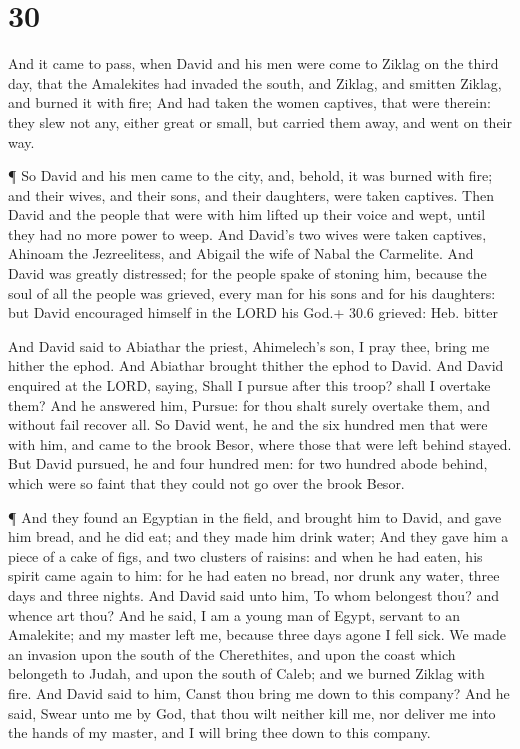 \hypertarget{section-29}{%
\section{30}\label{section-29}}

 And it came to pass, when David and his men were come to
Ziklag on the third day, that the Amalekites had invaded the south, and
Ziklag, and smitten Ziklag, and burned it with fire;  And
had taken the women captives, that were therein: they slew not any,
either great or small, but carried them away, and went on their way.

 ¶ So David and his men came to the city, and, behold, it
was burned with fire; and their wives, and their sons, and their
daughters, were taken captives.  Then David and the people
that were with him lifted up their voice and wept, until they had no
more power to weep.  And David's two wives were taken
captives, Ahinoam the Jezreelitess, and Abigail the wife of Nabal the
Carmelite.  And David was greatly distressed; for the people
spake of stoning him, because the soul of all the people was grieved,
every man for his sons and for his daughters: but David encouraged
himself in the LORD his God.+ 30.6 grieved: Heb. bitter

 And David said to Abiathar the priest, Ahimelech's son, I
pray thee, bring me hither the ephod. And Abiathar brought thither the
ephod to David.  And David enquired at the LORD, saying,
Shall I pursue after this troop? shall I overtake them? And he answered
him, Pursue: for thou shalt surely overtake them, and without fail
recover all.  So David went, he and the six hundred men that
were with him, and came to the brook Besor, where those that were left
behind stayed.  But David pursued, he and four hundred men:
for two hundred abode behind, which were so faint that they could not go
over the brook Besor.

 ¶ And they found an Egyptian in the field, and brought him
to David, and gave him bread, and he did eat; and they made him drink
water;  And they gave him a piece of a cake of figs, and
two clusters of raisins: and when he had eaten, his spirit came again to
him: for he had eaten no bread, nor drunk any water, three days and
three nights.  And David said unto him, To whom belongest
thou? and whence art thou? And he said, I am a young man of Egypt,
servant to an Amalekite; and my master left me, because three days agone
I fell sick.  We made an invasion upon the south of the
Cherethites, and upon the coast which belongeth to Judah, and upon the
south of Caleb; and we burned Ziklag with fire.  And David
said to him, Canst thou bring me down to this company? And he said,
Swear unto me by God, that thou wilt neither kill me, nor deliver me
into the hands of my master, and I will bring thee down to this company.

